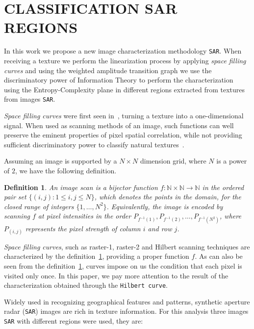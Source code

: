 \documentclass{isprs}
\begin{document}
	\section{CLASSIFICATION SAR REGIONS}\label{SAR}
	
	In this work we propose a new image characterization methodology \texttt{SAR}.
	When receiving a texture we perform the linearization process by applying \textit{space filling curves} and using the weighted amplitude transition graph we use the discriminatory power of Information Theory to perform the characterization using the Entropy-Complexity plane in different regions extracted from textures from images \texttt{SAR}.
	
	\textit{Space filling curves} were first seen in~\cite{Nguyen1982SpaceFC}, turning a texture into a one-dimensional signal.
	When used as scanning methods of an image, such functions can well preserve the eminent properties of pixel spatial correlation, while not providing sufficient discriminatory power to classify natural textures~\citep{Lee1994Texture}.
	
	Assuming an image is supported by a $N \times N$ dimension grid, where $N$ is a power of $2$, we have the following definition.
	
	\newtheorem{mydef}{Definition}
	\begin{mydef}
		An image scan is a bijector function $f \colon \mathbb{N} \times \mathbb{N} \to \mathbb{N}$ in the ordered pair set $ \{(i, j): 1 \leq i , j \leq N \}$, which denotes the points in the domain, for the closed range of integers $\{1, \dots, N^2\}$. Equivalently, the image is encoded by scanning $ f $ at pixel intensities in the order $P_{f^{-1}(1)}, P_{f^{-1}(2)}, \dots, P_{f^{-1}(N^2)}$, where $P_{(i, j)}$ represents the pixel strength of column $i$ and row $j$.
		\label{def:CurveFilling}
	\end{mydef}
	
	\textit{Space filling curves}, such as raster-1, raster-2 and Hilbert scanning techniques are characterized by the definition~\ref{def:CurveFilling}, providing a proper function $f$.
	As can also be seen from the definition~\ref{def:CurveFilling}, curves impose on us the condition that each pixel is visited only once.
	In this paper, we pay more attention to the result of the characterization obtained through the \texttt{Hilbert curve}.
	
	Widely used in recognizing geographical features and patterns, synthetic aperture radar (\texttt{SAR}) images are rich in texture information. For this analysis three images \texttt{SAR} with different regions were used, they are:
	
\end{document}

